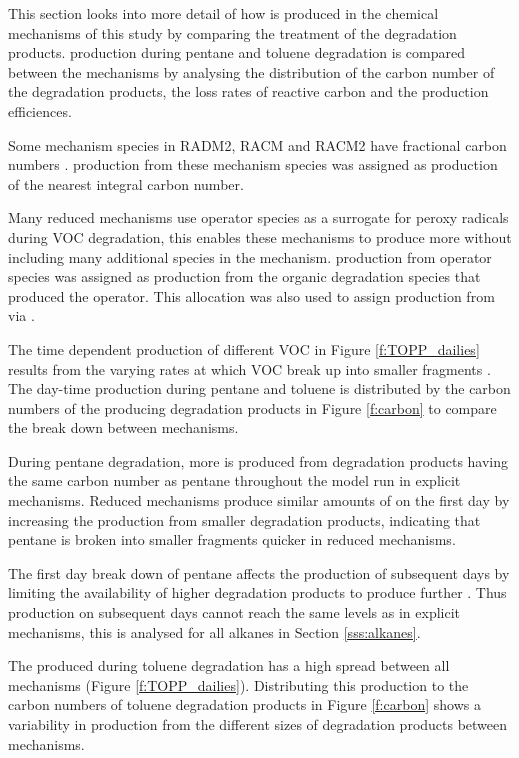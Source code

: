 This section looks into more detail of how  is produced in the chemical mechanisms of this study by comparing the treatment of the degradation products.
 production during pentane and toluene degradation is compared between the mechanisms by analysing the distribution of the carbon number of the degradation products, the loss rates of reactive carbon and the  production efficiences.

Some mechanism species in RADM2, RACM and RACM2 have fractional carbon numbers \citep{Stockwell:1990, Stockwell:1997, Goliff:2013}.
 production from these mechanism species was assigned as  production of the nearest integral carbon number.

Many reduced mechanisms use operator species as a surrogate for peroxy radicals during VOC degradation, this enables these mechanisms to produce more  without including many additional species in the mechanism.
 production from operator species was assigned as  production from the organic degradation species that produced the operator.
This allocation was also used to assign  production from  via .

The time dependent  production of different VOC in Figure \ref{f:TOPP_dailies} results from the varying rates at which VOC break up into smaller fragments \citep{Butler:2011}.
The day-time  production during pentane and toluene is distributed by the carbon numbers of the  producing degradation products in Figure \ref{f:carbon} to compare the break down between mechanisms.

During pentane degradation, more  is produced from degradation products having the same carbon number as pentane throughout the model run in explicit mechanisms.
Reduced mechanisms produce similar amounts of  on the first day by increasing the  production from smaller degradation products, indicating that pentane is broken into smaller fragments quicker in reduced mechanisms.  

The first day break down of pentane affects the  production of subsequent days by limiting the availability of higher degradation products to produce further .
Thus  production on subsequent days cannot reach the same levels as in explicit mechanisms, this is analysed for all alkanes in Section \ref{sss:alkanes}.

The  produced during toluene degradation has a high spread between all mechanisms (Figure \ref{f:TOPP_dailies}).
Distributing this  production to the carbon numbers of toluene degradation products in Figure \ref{f:carbon} shows a variability in  production from the different sizes of degradation products between mechanisms.

